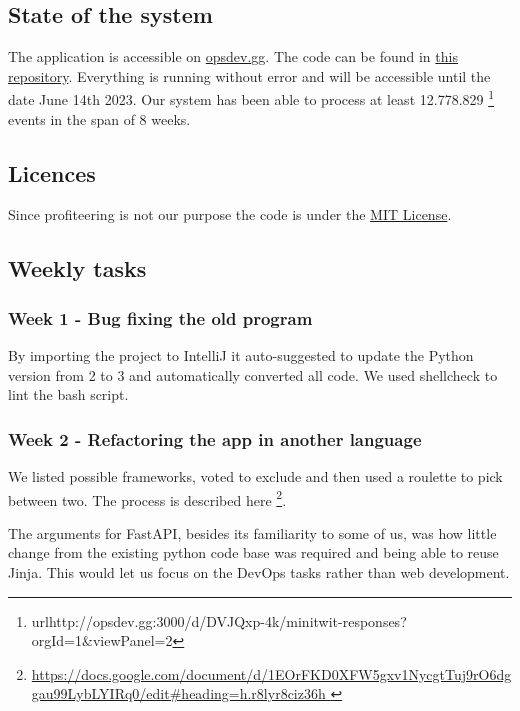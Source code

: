 \documentclass{article}
\begin{document}
\subsection{State of the system}

The application is accessible on \url{opsdev.gg}. The code can be found in \href{https://github.com/MinitwitGroupI/MiniTwit}{this repository}. Everything is running without error and will be accessible until the date June 14th 2023.
Our system has been able to process at least 12.778.829 \footnote{url{http://opsdev.gg:3000/d/DVJQxp-4k/minitwit-responses?orgId=1&viewPanel=2}} events in the span of 8 weeks.

\subsection{Licences}

Since profiteering is not our purpose the code is under the \href{https://github.com/MinitwitGroupI/MiniTwit/blob/main/LICENSE}{MIT License}.

\subsection{Weekly tasks}


\subsubsection{Week 1 - Bug fixing the old program}

By importing the project to IntelliJ it auto-suggested to update the Python version from 2 to 3 and automatically converted all code. We used shellcheck to lint the bash script.

\subsubsection{Week 2 - Refactoring the app in another language }

We listed possible frameworks, voted to exclude and then used a roulette to pick between two. The process is described here \footnote{\url{https://docs.google.com/document/d/1EOrFKD0XFW5gxv1NycgtTuj9rO6dggau99LybLYIRq0/edit\#heading=h.r8lyr8ciz36h }}. 

The arguments for FastAPI, besides its familiarity to some of us, was how little change from the existing python code base was required and being able to reuse Jinja. This would let us focus on the DevOps tasks rather than web development. 
\end{document}
